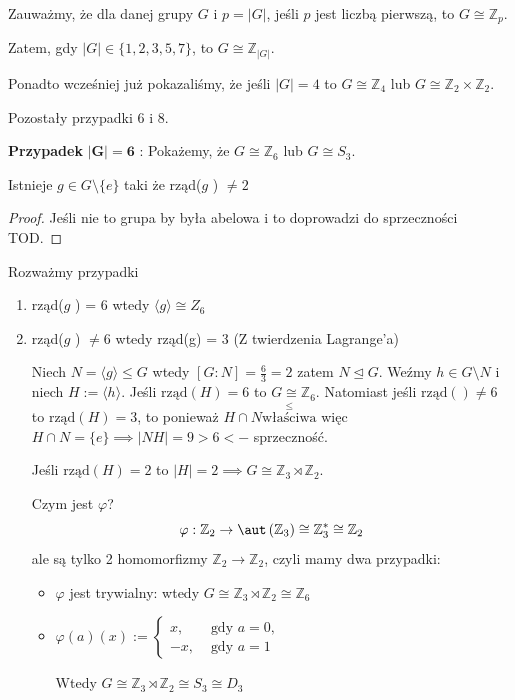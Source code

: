 Zauważmy, że dla danej grupy $G$ i $p = \left| G \right|$, jeśli $p$ jest liczbą pierwszą, to $G\cong\mathbb{Z}_{p}$.

Zatem, gdy $\left| G \right| \in \{1,2,3,5,7\} $, to $G\cong\mathbb{Z}_{\left| G \right| }$.

Ponadto wcześniej już pokazaliśmy, że jeśli $\left| G \right| = 4$ to $G\cong\mathbb{Z}_{4}$ lub $G\cong \mathbb{Z}_2\times \mathbb{Z}_2$.

Pozostały przypadki 6 i 8.

\textbf{Przypadek} $\bm{ \left| G \right| = 6 } $ : Pokażemy, że $G\cong\mathbb{Z}_6$ lub $G\cong S_{3}$.
\begin{fact}
Istnieje $g\in G\setminus \{e\} $ taki że rząd($g$ ) $\neq 2$
\end{fact}
\begin{proof}
	Jeśli nie to grupa by była abelowa i to doprowadzi do sprzeczności TOD. 
\end{proof} 
Rozważmy przypadki
\begin{enumerate}[label=\arabic*.]
	\item rząd($g$ ) = 6 wtedy $\langle g \rangle \cong Z_{6}$ 
	\item rząd($g$ ) $\neq 6$ wtedy rząd(g) = 3 (Z twierdzenia Lagrange'a)
	
		Niech $N= \langle g \rangle \le G$ wtedy $[G:N] = \frac{6}{3}=2$ zatem $N\unlhd G.$ Weźmy $h\in G\setminus N$ i niech $H := \langle h \rangle $. Jeśli $\text{rząd}\left( H \right) = 6$ to $G\cong\mathbb{Z}_6$. Natomiast jeśli $\text{rząd}\left(  \right) \neq 6$ to $\text{rząd}\left( H \right) =3$, to ponieważ $H\cap N \overset{\le }{\text{właściwa}}$ więc $H\cap N= \{e\} \implies \left| NH \right| =9 > 6 <-$ sprzeczność.

		Jeśli $\text{rząd}\left( H \right) = 2$ to $\left| H \right| = 2 \implies G\cong \mathbb{Z}_3\rtimes\mathbb{Z}_2$.

		Czym jest $\varphi$? \[
		\varphi : \mathbb{Z}_2 \to \aut\left(\mathbb{Z}_3\right) \cong \mathbb{Z}_3^{*} \cong \mathbb{Z}_2
		\] 
                ale są tylko 2 homomorfizmy $\mathbb{Z}_2\to \mathbb{Z}_2$, czyli mamy dwa przypadki:
		\begin{itemize}
			\item $\varphi $ jest trywialny: wtedy $G\cong \mathbb{Z}_3\rtimes\mathbb{Z}_2 \cong\mathbb{Z}_6$
			\item $\varphi\left( a \right) \left( x \right) := \begin{cases}
					x, &\text{ gdy } a= 0,\\
					-x, &\text{ gdy } a=1
			\end{cases}$ 

			Wtedy $G\cong \mathbb{Z}_3\rtimes\mathbb{Z}_2 \cong S_{3} \cong D_{3}$
		\end{itemize}
\end{enumerate}

